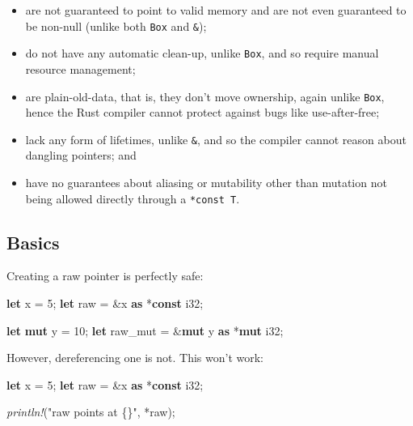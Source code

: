 \documentclass[a4paper,]{book}
\newenvironment{Shaded}{\begin{snugshade}}{\end{snugshade}}
\newcommand{\KeywordTok}[1]{\textcolor[rgb]{0.13,0.29,0.53}{\textbf{{#1}}}}
\newcommand{\DataTypeTok}[1]{\textcolor[rgb]{0.13,0.29,0.53}{{#1}}}
\newcommand{\DecValTok}[1]{\textcolor[rgb]{0.00,0.00,0.81}{{#1}}}
\newcommand{\StringTok}[1]{\textcolor[rgb]{0.31,0.60,0.02}{{#1}}}
\newcommand{\PreprocessorTok}[1]{\textcolor[rgb]{0.56,0.35,0.01}{\textit{{#1}}}}
\newcommand{\NormalTok}[1]{{#1}}
\providecommand{\tightlist}{%
  \setlength{\itemsep}{0pt}\setlength{\parskip}{0pt}}
\begin{document}
\begin{itemize}
\tightlist
\item
  are not guaranteed to point to valid memory and are not even
  guaranteed to be non-null (unlike both \texttt{Box} and \texttt{\&});
\item
  do not have any automatic clean-up, unlike \texttt{Box}, and so
  require manual resource management;
\item
  are plain-old-data, that is, they don't move ownership, again unlike
  \texttt{Box}, hence the Rust compiler cannot protect against bugs like
  use-after-free;
\item
  lack any form of lifetimes, unlike \texttt{\&}, and so the compiler
  cannot reason about dangling pointers; and
\item
  have no guarantees about aliasing or mutability other than mutation
  not being allowed directly through a \texttt{*const\ T}.
\end{itemize}

\subsection{Basics}\label{basics}

Creating a raw pointer is perfectly safe:

\begin{Shaded}
\begin{Highlighting}[]
\KeywordTok{let} \NormalTok{x = }\DecValTok{5}\NormalTok{;}
\KeywordTok{let} \NormalTok{raw = &x }\KeywordTok{as} \NormalTok{*}\KeywordTok{const} \DataTypeTok{i32}\NormalTok{;}

\KeywordTok{let} \KeywordTok{mut} \NormalTok{y = }\DecValTok{10}\NormalTok{;}
\KeywordTok{let} \NormalTok{raw_mut = &}\KeywordTok{mut} \NormalTok{y }\KeywordTok{as} \NormalTok{*}\KeywordTok{mut} \DataTypeTok{i32}\NormalTok{;}
\end{Highlighting}
\end{Shaded}

However, dereferencing one is not. This won't work:

\begin{Shaded}
\begin{Highlighting}[]
\KeywordTok{let} \NormalTok{x = }\DecValTok{5}\NormalTok{;}
\KeywordTok{let} \NormalTok{raw = &x }\KeywordTok{as} \NormalTok{*}\KeywordTok{const} \DataTypeTok{i32}\NormalTok{;}

\PreprocessorTok{println!}\NormalTok{(}\StringTok{"raw points at \{\}"}\NormalTok{, *raw);}
\end{Highlighting}
\end{Shaded}
\end{document}
